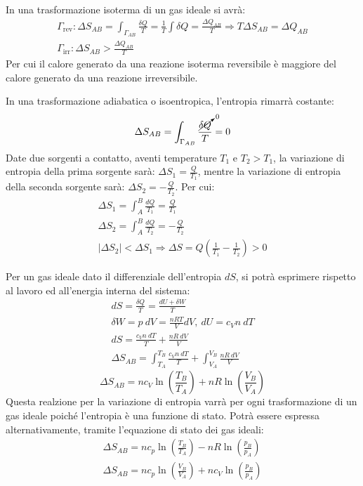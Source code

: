 \documentclass{article}
\numberwithin{equation}{subsection}
\begin{document}
In una trasformazione isoterma di un gas ideale si avrà:
\begin{gather*}
    \Gamma_{\mbox{rev}}:\Delta S_{AB}=\displaystyle\int_{\Gamma_{AB}}\frac{\delta Q}{T}=\frac{1}{T}\int\delta Q=\frac{\Delta Q_{AB}}{T}\Rightarrow T\Delta S_{AB}=\Delta Q_{AB}\\
    \Gamma_{\mbox{irr}}:\Delta S_{AB}>\frac{\Delta Q_{AB}}{T}
\end{gather*}
Per cui il calore generato da una reazione isoterma reversibile è maggiore del calore generato da una reazione irreversibile. 


In una trasformazione adiabatica o isoentropica, l'entropia rimarrà costante:
\begin{equation*}
    \Delta S_{AB}=\displaystyle\int_{\Gamma_{AB}}\frac{\cancelto{0}{\delta Q}}{T}=0
\end{equation*}
Date due sorgenti a contatto, aventi temperature $T_1$ e $T_2>T_1$, la variazione di entropia della prima sorgente sarà: $\Delta S_1=\displaystyle\frac{Q}{T_1}$, mentre 
la variazione di entropia della seconda sorgente sarà: $\Delta S_2=-\displaystyle\frac{Q}{T_2}$. Per cui:
\begin{gather*}
    \Delta S_1=\displaystyle\int_{A}^B\frac{dQ}{T_1}=\frac{Q}{T_1}\\
    \Delta S_2=\displaystyle\int_{A}^B\frac{dQ}{T_2}=-\frac{Q}{T_2}\\
    |\Delta S_2|<\Delta S_1\Rightarrow\Delta S=Q\left(\displaystyle\frac{1}{T_1}-\frac{1}{T_2}\right)>0
\end{gather*}

Per un gas ideale dato il differenziale dell'entropia $dS$, si potrà esprimere rispetto al lavoro ed all'energia interna del sistema:
\begin{gather*}
    dS=\displaystyle\frac{\delta Q}{T}=\frac{dU+\delta W}{T}\\
    \delta  W=p\:dV=\displaystyle\frac{nRT}{V}dV,\:dU=c_Vn\:dT\\
    dS=\displaystyle\frac{c_Vn\:dT}{T}+\frac{nR\:dV}{V}\\
    \Delta S_{AB}=\int_{T_A}^{T_B}\displaystyle\frac{c_Vn\:dT}{T}+\int_{V_A}^{V_B}\frac{nR\:dV}{V}
\end{gather*} 
\begin{equation}
    \Delta S_{AB}=nc_V\ln\left(\displaystyle\frac{T_B}{T_A}\right)+nR\ln\left(\frac{V_B}{V_A}\right)
\end{equation}
Questa realzione per la variazione di entropia varrà per ogni trasformazione di un gas ideale poiché l'entropia è una funzione di stato. Potrà essere espressa 
alternativamente, tramite l'equazione di stato dei gas ideali:
\begin{gather}
    \Delta S_{AB}=nc_p\ln\left(\displaystyle\frac{T_B}{T_A}\right)-nR\ln\left(\displaystyle\frac{p_B}{p_A}\right)\\
    \Delta S_{AB}=nc_p\ln\left(\displaystyle\frac{V_B}{V_A}\right)+nc_V\ln\left(\frac{p_B}{p_A}\right)
\end{gather}
\end{document}
